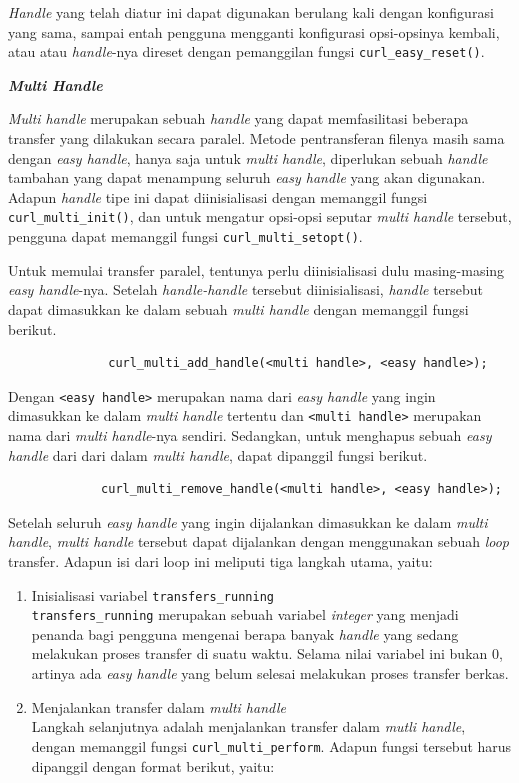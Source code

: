 \documentclass[a4paper,twoside]{article}
\begin{document}
\begin{enumerate}
\textit{Handle} yang telah diatur ini dapat digunakan berulang kali dengan konfigurasi yang sama, sampai entah pengguna mengganti konfigurasi opsi-opsinya kembali, atau atau \textit{handle}-nya direset dengan pemanggilan fungsi \verb|curl_easy_reset()|.

\textbf{\textit{Multi Handle}}

\textit{Multi handle} merupakan sebuah \textit{handle} yang dapat memfasilitasi beberapa transfer yang dilakukan secara paralel. Metode pentransferan filenya masih sama dengan \textit{easy handle}, hanya saja untuk \textit{multi handle}, diperlukan sebuah \textit{handle} tambahan yang dapat menampung seluruh \textit{easy handle} yang akan digunakan. Adapun \textit{handle} tipe ini dapat diinisialisasi dengan memanggil fungsi \verb|curl_multi_init()|, dan untuk mengatur opsi-opsi seputar \textit{multi handle} tersebut, pengguna dapat memanggil fungsi \verb|curl_multi_setopt()|.

Untuk memulai transfer paralel, tentunya perlu diinisialisasi dulu masing-masing \textit{easy handle}-nya. Setelah \textit{handle-handle} tersebut diinisialisasi, \textit{handle} tersebut dapat dimasukkan ke dalam sebuah \textit{multi handle} dengan memanggil fungsi berikut.

\begin{verbatim}
              curl_multi_add_handle(<multi handle>, <easy handle>);
\end{verbatim}
\noindent
Dengan \verb|<easy handle>| merupakan nama dari \textit{easy handle} yang ingin dimasukkan ke dalam \textit{multi handle} tertentu dan \verb|<multi handle>| merupakan nama dari \textit{multi handle}-nya sendiri. Sedangkan, untuk menghapus sebuah \textit{easy handle} dari dari dalam \textit{multi handle}, dapat dipanggil fungsi berikut.

\begin{verbatim}
             curl_multi_remove_handle(<multi handle>, <easy handle>);
\end{verbatim}

Setelah seluruh \textit{easy handle} yang ingin dijalankan dimasukkan ke dalam \textit{multi handle}, \textit{multi handle} tersebut dapat dijalankan dengan menggunakan sebuah \textit{loop} transfer. Adapun isi dari loop ini meliputi tiga langkah utama, yaitu:

\begin{enumerate}
	\item Inisialisasi variabel \verb|transfers_running|\\
	\verb|transfers_running| merupakan sebuah variabel \textit{integer} yang menjadi penanda bagi pengguna mengenai berapa banyak \textit{handle} yang sedang melakukan proses transfer di suatu waktu. Selama nilai variabel ini bukan 0, artinya ada \textit{easy handle} yang belum selesai melakukan proses transfer berkas.
	\item Menjalankan transfer dalam \textit{multi handle}\\
	Langkah selanjutnya adalah menjalankan transfer dalam \textit{mutli handle}, dengan memanggil fungsi \verb|curl_multi_perform|. Adapun fungsi tersebut harus dipanggil dengan format berikut, yaitu:


\end{enumerate}
\end{enumerate}
\end{document}
